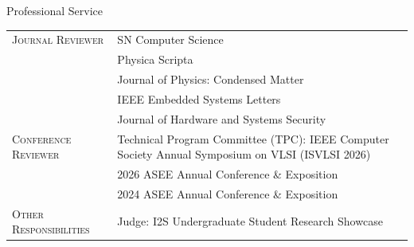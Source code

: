 \begin{rSection}{Professional Service}

\begin{tabularx}{\linewidth}{@{}p{5.8cm}X@{}}

\textsc{Journal Reviewer} &
SN Computer Science \\

& Physica Scripta \\

& Journal of Physics: Condensed Matter \\

& IEEE Embedded Systems Letters \\

& Journal of Hardware and Systems Security \\[0.2cm]


\textsc{Conference Reviewer} &
Technical Program Committee (TPC): IEEE Computer Society Annual Symposium on VLSI (ISVLSI 2026) \\

&
2026 ASEE Annual Conference \& Exposition \\

& 2024 ASEE Annual Conference \& Exposition \\[0.2cm]


\textsc{Other Responsibilities} &
Judge: I2S Undergraduate Student Research Showcase \\

\end{tabularx}

\end{rSection}
